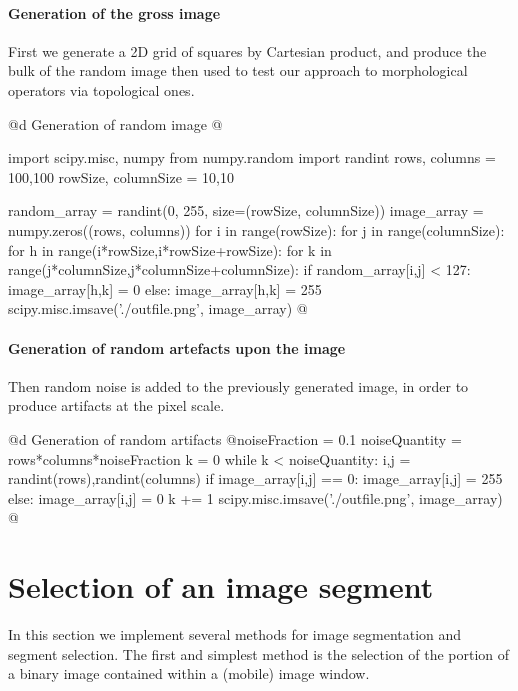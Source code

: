 \documentclass[11pt,oneside]{article}	%
\begin{document}
\paragraph{Generation of the gross image}
First we generate a 2D grid of squares by Cartesian product, and produce the bulk of the random image then used to test our approach to morphological operators via topological ones.


%
%
%

@d Generation of random image
@{import scipy.misc, numpy
from numpy.random import randint
rows, columns = 100,100
rowSize, columnSize = 10,10

random_array = randint(0, 255, size=(rowSize, columnSize))
image_array = numpy.zeros((rows, columns))
for i in range(rowSize):
	for j in range(columnSize):
		for h in range(i*rowSize,i*rowSize+rowSize): 
			for k in range(j*columnSize,j*columnSize+columnSize):
				if random_array[i,j] < 127:
					image_array[h,k] = 0 
				else: 
					image_array[h,k] = 255
scipy.misc.imsave('./outfile.png', image_array)
@}

\paragraph{Generation of random artefacts upon the image}

Then random noise is added to the previously generated image, in order to produce artifacts at the pixel scale. 

@d Generation of random artifacts
@{noiseFraction = 0.1
noiseQuantity = rows*columns*noiseFraction
k = 0
while k < noiseQuantity:
	i,j = randint(rows),randint(columns)
	if image_array[i,j] == 0: image_array[i,j] = 255
	else: image_array[i,j] = 0
	k += 1
scipy.misc.imsave('./outfile.png', image_array)
@}


\section{Selection of an image segment}

In this section we implement several methods for image segmentation and segment selection. The first and simplest method is the selection of the portion of a binary image contained within a (mobile) image window.
\end{document}
